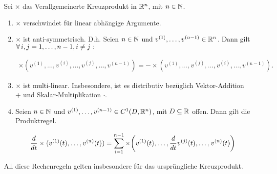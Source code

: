 \begin{lemma*}

Sei $\times$ das Verallgemeinerte Kreuzprodukt in $\mathbb{R}^n$, mit $n \in \mathbb{N}$.

\begin{enumerate}[label = (\roman*)]

  \item
  $\times$ verschwindet für linear abhängige Argumente.

  \item
  $\times$ ist anti-symmetrisch.
  D.h.
  Seien $n \in \mathbb{N}$ und $v^{(1)}, \ldots, v^{(n-1)} \in \mathbb{R}^n$.
  Dann gilt $\forall \, i, j = 1, \ldots, n-1, i \neq j:$

  \begin{align*}
    \times(v^{(1)}, \ldots, v^{(i)}, \ldots, v^{(j)}, \ldots, v^{(n-1)})
    =
    -
    \times(v^{(1)}, \ldots, v^{(j)}, \ldots, v^{(i)}, \ldots, v^{(n-1)}).
  \end{align*}

  \item
  $\times$ ist multi-linear.
  Insbesondere, ist es distributiv bezüglich Vektor-Addition $+$ und Skalar-Multiplikation $\cdot$.

  \item
  Seien $n \in \mathbb{N}$ und $v^{(1)}, \ldots, v^{(n-1)} \in C^1(D, \mathbb{R}^n)$, mit $D \subseteq \mathbb{R}$ offen.
  Dann gilt die Produktregel.

  \begin{align*}
    \frac{d}{dt}
    \times(v^{(1)}(t), \ldots, v^{(n)}(t))
    =
    \sum_{i=1}^{n-1}
    \times {\left ( 
      v^{(1)}(t),
      \ldots,
      \frac{d}{dt}
      v^{(j)}(t),
      \ldots,
      v^{(n)}(t)
     \right )}
  \end{align*}

\end{enumerate}

All diese Rechenregeln gelten insbesondere für das ursprüngliche Kreuzprodukt.

\end{lemma*}

